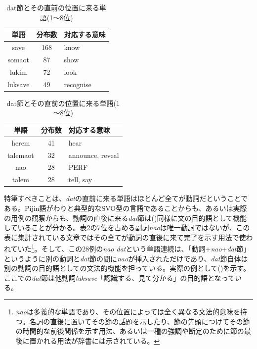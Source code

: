 \begin{table}[h]
  \caption{dat節とその直前の位置に来る単語(1～8位)}
  \label{tb:datl1}
  \begin{minipage}{0.5\hsize}
  \begin{center}
    \begin{tabular}{|c||c|l|} \hline
      単語 & 分布数 & 対応する意味 \\ \hline \hline
      save & 168 & know\\ \hline
      somaot & 87 & show\\ \hline
      lukim & 72 & look\\ \hline
      luksave & 49 & recognise\\ \hline
    \end{tabular}
  \end{center}
  \end{minipage}
  \begin{minipage}{0.5\hsize}
    \begin{center}
      \begin{tabular}{|c||c|l|} \hline
        単語 & 分布数 & 対応する意味 \\ \hline \hline
        herem & 41 & hear \\ \hline
        talemaot & 32 & announce, reveal\\ \hline
        nao & 28 & PERF\\ \hline
        talem & 28 & tell, say\\ \hline
      \end{tabular}
    \end{center}
  \end{minipage}
\end{table}

特筆すべきことは、\textit{dat}の直前に来る単語はほとんど全てが動詞だということである。Pijin語がわりと典型的なSVO型の言語であることからも、あるいは実際の用例の観察からも、動詞の直後に来る\textit{dat}節は()同様に文の目的語として機能していることが分かる。表\ref{tb:datl1}の7位を占める副詞\textit{nao}は唯一動詞ではないが、この表に集計されている文章ではその全てが動詞の直後に来て完了を示す用法で使われていた\footnote{\textit{nao}は多義的な単語であり、その位置によっては全く異なる文法的意味を持つ。名詞の直後に置いてその節の話題を示したり、節の先頭につけてその節の時間的な前後関係を示す用法、あるいは一種の強調や断定のために節の最後に置かれる用法が辞書\citep[145]{dictionary}には示されている。}。そして、この28例の\textit{nao dat}という単語連続は、「動詞+\textit{nao}+\textit{dat}節」というように別の動詞と\textit{dat}節の間に\textit{nao}が挿入されただけであり、\textit{dat}節自体は別の動詞の目的語としての文法的機能を担っている。実際の例として()を示す。ここでの\textit{dat}節は他動詞\textit{luksave}「認識する、見て分かる」の目的語となっている。

